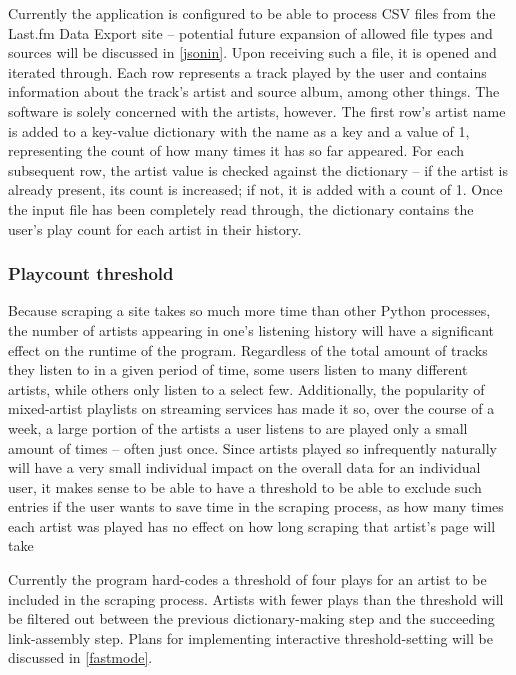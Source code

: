 Currently the application is configured to be able to process CSV files from the Last.fm Data Export site -- potential future expansion of allowed file types and sources will be discussed in \autoref{jsonin}. Upon receiving such a file, it is opened and iterated through. Each row represents a track played by the user and contains information about the track's artist and source album, among other things. The software is solely concerned with the artists, however. The first row's artist name is added to a key-value dictionary with the name as a key and a value of 1, representing the count of how many times it has so far appeared. For each subsequent row, the artist value is checked against the dictionary -- if the artist is already present, its count is increased; if not, it is added with a count of 1. Once the input file has been completely read through, the dictionary contains the user's play count for each artist in their history.

\subsubsection{Playcount threshold}

Because scraping a site takes so much more time than other Python processes, the number of artists appearing in one's listening history will have a significant effect on the runtime of the program. Regardless of the total amount of tracks they listen to in a given period of time, some users listen to many different artists, while others only listen to a select few. Additionally, the popularity of mixed-artist playlists on streaming services has made it so, over the course of a week, a large portion of the artists a user listens to are played only a small amount of times -- often just once. Since artists played so infrequently naturally will have a very small individual impact on the overall data for an individual user, it makes sense to be able to have a threshold to be able to exclude such entries if the user wants to save time in the scraping process, as how many times each artist was played has no effect on how long scraping that artist's page will take

Currently the program hard-codes a threshold of four plays for an artist to be included in the scraping process. Artists with fewer plays than the threshold will be filtered out between the previous dictionary-making step and the succeeding link-assembly step. Plans for implementing interactive threshold-setting will be discussed in \autoref{fastmode}.

